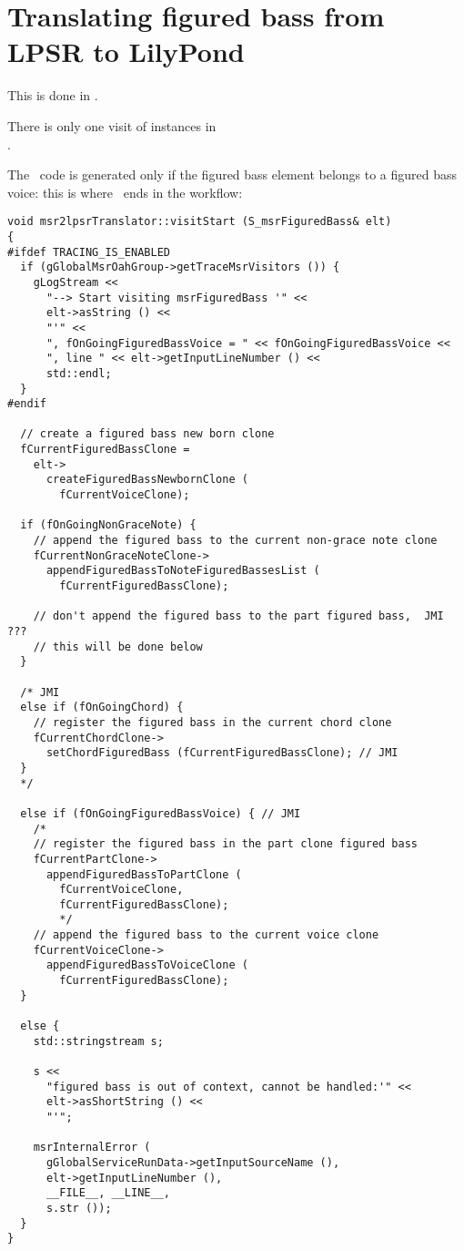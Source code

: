 \section{Translating figured bass from LPSR to LilyPond}

This is done in \lpsrToLilypond{}.

There is only one visit of  instances in\\
.

The \lily\ code is generated only if the figured bass element belongs to a figured bass voice: this is where \denorm\ ends in the workflow:%
\begin{lstlisting}[language=CPlusPlus]
void msr2lpsrTranslator::visitStart (S_msrFiguredBass& elt)
{
#ifdef TRACING_IS_ENABLED
  if (gGlobalMsrOahGroup->getTraceMsrVisitors ()) {
    gLogStream <<
      "--> Start visiting msrFiguredBass '" <<
      elt->asString () <<
      "'" <<
      ", fOnGoingFiguredBassVoice = " << fOnGoingFiguredBassVoice <<
      ", line " << elt->getInputLineNumber () <<
      std::endl;
  }
#endif

  // create a figured bass new born clone
  fCurrentFiguredBassClone =
    elt->
      createFiguredBassNewbornClone (
        fCurrentVoiceClone);

  if (fOnGoingNonGraceNote) {
    // append the figured bass to the current non-grace note clone
    fCurrentNonGraceNoteClone->
      appendFiguredBassToNoteFiguredBassesList (
      	fCurrentFiguredBassClone);

    // don't append the figured bass to the part figured bass,  JMI ???
    // this will be done below
  }

  /* JMI
  else if (fOnGoingChord) {
    // register the figured bass in the current chord clone
    fCurrentChordClone->
      setChordFiguredBass (fCurrentFiguredBassClone); // JMI
  }
  */

  else if (fOnGoingFiguredBassVoice) { // JMI
    /*
    // register the figured bass in the part clone figured bass
    fCurrentPartClone->
      appendFiguredBassToPartClone (
        fCurrentVoiceClone,
        fCurrentFiguredBassClone);
        */
    // append the figured bass to the current voice clone
    fCurrentVoiceClone->
      appendFiguredBassToVoiceClone (
        fCurrentFiguredBassClone);
  }

  else {
    std::stringstream s;

    s <<
      "figured bass is out of context, cannot be handled:'" <<
      elt->asShortString () <<
      "'";

    msrInternalError (
      gGlobalServiceRunData->getInputSourceName (),
      elt->getInputLineNumber (),
      __FILE__, __LINE__,
      s.str ());
  }
}
\end{lstlisting}

